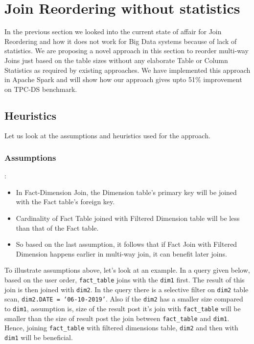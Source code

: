 \section{Join Reordering without statistics}\label{sec:jo}
In the previous section we looked into the current state of affair for Join Reordering and how it does not work for Big Data systems because of lack of statistics. We are proposing a novel approach in this section to reorder multi-way Joins just based on the table sizes without any elaborate Table or Column Statistics as required by existing approaches.
We have implemented this approach in Apache Spark and will show how our approach gives upto 51\% improvement on TPC-DS benchmark.

\subsection{Heuristics}

Let us look at the assumptions and heuristics used for the approach.

\subsubsection{Assumptions}\label{subsubsec:assumption}:

\begin{itemize}
\item In Fact-Dimension Join, the Dimension table’s primary key will be joined with the Fact table’s foreign key.
\item Cardinality of Fact Table joined with Filtered Dimension table will be less than that of the Fact table.
\item So based on the last assumption, it follows that if Fact Join with Filtered Dimension happens earlier in multi-way join, it can benefit later joins.
\end{itemize}

To illustrate assumptions above, let's look at an example. In a query given below, based on the user order,  \texttt{fact\_table} joins with the \texttt{dim1} first. The result of this join is then joined with \texttt{dim2}. In the query there is a selective filter on \texttt{dim2} table scan, \texttt{dim2.DATE = ‘06-10-2019’}. Also if the \texttt{dim2} has a smaller size compared to \texttt{dim1}, assumption is, size of the result post it's join with \texttt{fact\_table} will be smaller than the size of result post the join between \texttt{fact\_table} and \texttt{dim1}. Hence, joining \texttt{fact\_table} with filtered dimensions table, \texttt{dim2} and then with \texttt{dim1} will be beneficial.

